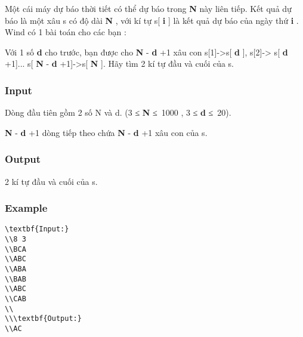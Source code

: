 



   Một cái máy dự báo thời tiết có thể dự báo trong   \textbf{    N   }   này liên tiếp. Kết quả dự báo là một xâu s có độ dài   \textbf{    N   }   , với kí tự s[   \textbf{    i   }   ] là kết quả dự báo của ngày thứ   \textbf{    i   }   . Wind có 1 bài toán cho các bạn :  

   Với 1 số   \textbf{    d   }   cho trước, bạn được cho   \textbf{    N   }   -   \textbf{    d   }   +1 xâu con s[1]->s[   \textbf{    d   }   ], s[2]-> s[   \textbf{    d   }   +1]... s[   \textbf{    N   }   -   \textbf{    d   }   +1]->s[   \textbf{    N   }   ]. Hãy tìm 2 kí tự đầu và cuối của s.  

\subsubsection{   Input  }

   Dòng đầu tiên gồm 2 số N và d. (3 ≤   \textbf{    N   }   ≤ 1000 , 3 ≤   \textbf{    d   }   ≤ 20).  

\textbf{    N   }   -   \textbf{    d   }   +1 dòng tiếp theo chứa   \textbf{    N   }   -   \textbf{    d   }   +1 xâu con của s.  

\subsubsection{   Output  }

   2 kí tự đầu và cuối của s.  

\subsubsection{   Example  }
\begin{verbatim}
\textbf{Input:}
\\8 3
\\BCA
\\ABC
\\ABA
\\BAB
\\ABC
\\CAB
\\
\\\textbf{Output:}
\\AC\end{verbatim}
